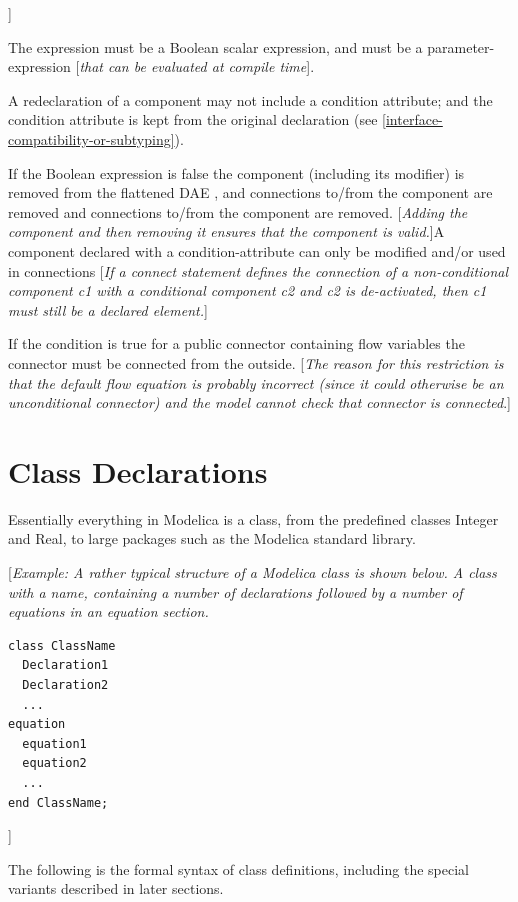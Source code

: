 \documentclass[10pt,a4paper]{report}
\def\doublelabel#1{\label{#1}}
\begin{document}
{]}

The expression must be a Boolean scalar expression, and must be a
parameter-expression {[}\emph{that can be evaluated at compile time}{]}.

A redeclaration of a component may not include a condition attribute;
and the condition attribute is kept from the original declaration (see
\ref{interface-compatibility-or-subtyping}).

If the Boolean expression is false the component (including its
modifier) is removed from the flattened DAE , and connections to/from
the component are removed and connections to/from the component are
removed. {[}\emph{Adding the component and then removing it ensures that
the component is valid.}{]}A component declared with a
condition-attribute can only be modified and/or used in connections
{[}\emph{If a connect statement defines the connection of a
non-conditional component c1 with a conditional component c2 and c2 is
de-activated, then c1 must still be a declared element.}{]}

If the condition is true for a public connector containing flow
variables the connector must be connected from the outside. {[}\emph{The
reason for this restriction is that the default flow equation is
probably incorrect (since it could otherwise be an unconditional
connector) and the model cannot check that connector is connected}.{]}

\section{Class Declarations}\doublelabel{class-declarations}

Essentially everything in Modelica is a class, from the predefined
classes Integer and Real, to large packages such as the Modelica
standard library.

{[}\emph{Example: A rather typical structure of a Modelica class is
shown below. A class with a name, containing a number of declarations
followed by a number of equations in an equation section.}

\begin{lstlisting}[language=modelica]
class ClassName
  Declaration1
  Declaration2
  ...
equation
  equation1
  equation2
  ...
end ClassName;
\end{lstlisting}

{]}

The following is the formal syntax of class definitions, including the
special variants described in later sections.
\end{document}
